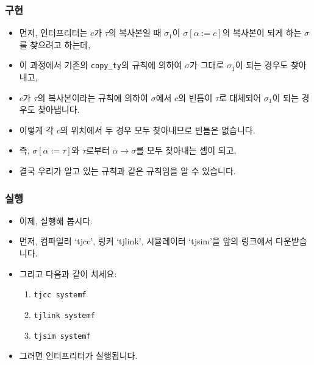 \documentclass[slidestop,compress,mathserif]{beamer}
\begin{document}
    \begin{frame}
        \frametitle{구현}
        \begin{itemize}
            \item 먼저, 인터프리터는 $c$가 $\tau$의 복사본일 때 $\sigma_1$이 $\sigma \left[ \alpha := c \right]$의 복사본이 되게 하는 $\sigma$를 찾으려고 하는데,
            \item 이 과정에서 기존의 \texttt{copy\_ty}의 규칙에 의하여 $\sigma$가 그대로 $\sigma_1$이 되는 경우도 찾아내고,
            \item $c$가 $\tau$의 복사본이라는 규칙에 의하여 $\sigma$에서 $c$의 빈틈이 $\tau$로 대체되어 $\sigma_1$이 되는 경우도 찾아냅니다.
            \item 이렇게 각 $c$의 위치에서 두 경우 모두 찾아내므로 빈틈은 없습니다.
            \item 즉, $\sigma \left[ \alpha := \tau \right]$와 $\tau$로부터 $\alpha \to \sigma$를 모두 찾아내는 셈이 되고,
            \item 결국 우리가 알고 있는 규칙과 같은 규칙임을 알 수 있습니다.
        \end{itemize}
    \end{frame}

    \begin{frame}
        \frametitle{실행}
        \begin{itemize}
            \item 이제, 실행해 봅시다.
            \item 먼저, 컴파일러 `tjcc', 링커 `tjlink', 시뮬레이터 `tjsim'을 앞의 링크에서 다운받습니다.
            \item 그리고 다음과 같이 치세요:
            \begin{enumerate}
                \item \texttt{tjcc systemf}
                \item \texttt{tjlink systemf}
                \item \texttt{tjsim systemf}
            \end{enumerate}
            \item 그러면 인터프리터가 실행됩니다.
        \end{itemize}
    \end{frame}
\end{document}

